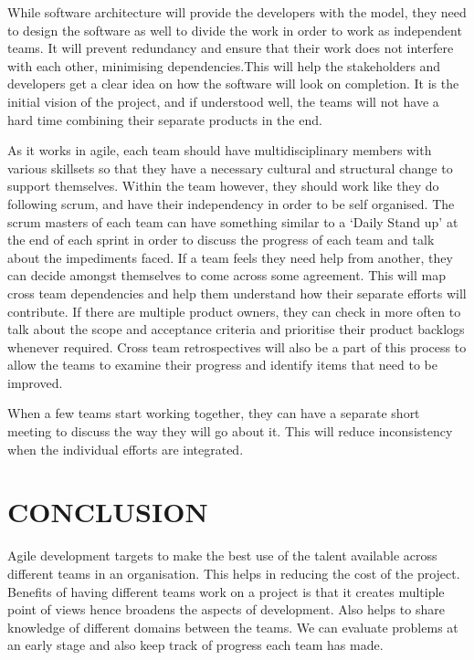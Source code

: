 \documentclass[sigconf]{acmart}
\begin{document}
While software architecture will provide the developers with the model, they need to design the software as well to divide the work in order to work as independent teams. It will prevent redundancy and ensure that their work does not interfere with each other, minimising dependencies.This will help the stakeholders and developers get a clear idea on how the software will look on completion. It is the initial vision of the project, and if understood well, the teams will not have a hard time combining their separate products in the end.

As it works in agile, each team should have multidisciplinary members with various skillsets so that they have a necessary cultural and structural change to support themselves. Within the team however, they should work like they do following scrum, and have their independency in order to be self organised. The scrum masters of each team can have something similar to a ‘Daily Stand up’ at the end of each sprint in order to discuss the progress of each team and talk about the impediments faced. If a team feels they need help from another, they can decide amongst themselves to come across some agreement. This will map cross team dependencies and help them understand how their separate efforts will contribute. If there are multiple product owners, they can check in more often to talk about the scope and acceptance criteria and prioritise their product backlogs whenever required. Cross team retrospectives will also be a part of this process to allow the teams to examine their progress and identify items that need to be improved.  

When a few teams start working together, they can have a separate short meeting to discuss the way they will go about it. This will reduce inconsistency when the individual efforts are integrated. 



\section{CONCLUSION}
Agile development targets to make the best use of the talent available across different teams in an organisation. This helps in reducing the cost of the project. Benefits of having different teams work on a project is that it creates multiple point of views hence broadens the aspects of development. Also helps to share knowledge of different domains between the teams. We can evaluate problems at an early stage and also keep track of progress each team has made.
\end{document}
